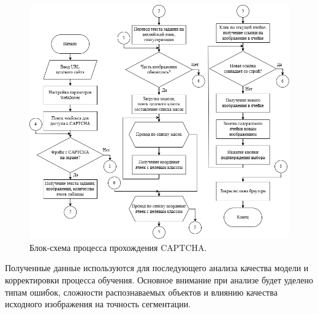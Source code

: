 \begin{figure}[H]
    \centering
    \includegraphics[width=1\textwidth]{imgs/solve_captcha_flow.png}
    \caption{Блок-схема процесса прохождения CAPTCHA.}
    \label{fig:solve-captcha}
\end{figure}
\vspace{-0.5cm}

Полученные данные используются для последующего анализа качества модели и корректировки процесса обучения. Основное внимание при анализе будет уделено типам ошибок, сложности распознаваемых объектов и влиянию качества исходного изображения на точность сегментации.

